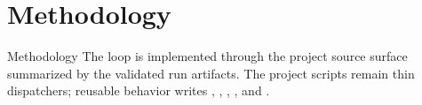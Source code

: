 \documentclass[
  ignorenonframetext,
]{beamer}
\author{\texorpdfstring{}{}}
\date{}
\begin{document}
\section{Methodology}\label{sec:methodology}

\begin{frame}{Methodology}
The loop is implemented through the project source surface summarized by
the validated run artifacts. The project scripts remain thin
dispatchers; reusable behavior writes
,
,
,
, and
.
\end{frame}
\end{document}
